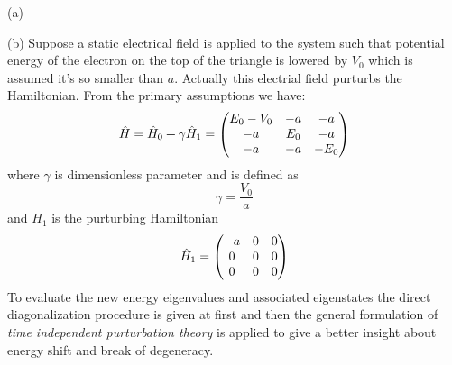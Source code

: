 \begin{homeworkProblem}
\begin{homeworkSection}{(a)}
\end{homeworkSection}
\begin{homeworkSection}{(b)}
Suppose a static electrical field is applied to the system such that potential energy of the electron on the top of the triangle is lowered by $V_0$ which is assumed it's so smaller than $a$. Actually this electrial field purturbs the Hamiltonian. From the primary assumptions we have:
\begin{equation}\label{P5-look}
\Hat{H}=\Hat{H}_0+\gamma\Hat{H}_1=
\begin{pmatrix}
E_0-V_0 & -a &-a\\
-a & E_0 &-a \\
-a &-a &-E_0
\end{pmatrix}
\end{equation}
where $\gamma$ is dimensionless parameter and is defined as
\begin{equation}
\gamma=\frac{V_0}{a}
\end{equation}
and $H_1$ is the purturbing Hamiltonian 
\begin{equation}
\Hat{H}_1=
\begin{pmatrix}
-a & 0 & 0\\
0 & 0 & 0\\
0 & 0 & 0
\end{pmatrix}
\end{equation}
To evaluate the new energy eigenvalues and associated eigenstates the direct diagonalization procedure is given at first and then  the general formulation of \textit{time independent purturbation theory} is applied to give a better insight about energy shift and break of degeneracy.


\end{homeworkSection}
\end{homeworkProblem}
